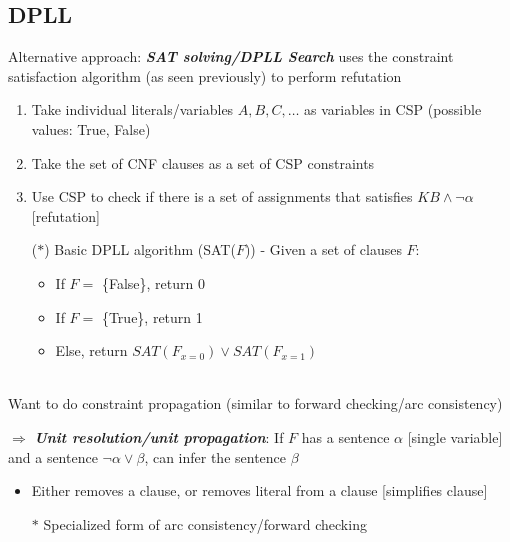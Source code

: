 \documentclass[12pt]{extarticle}
\theoremstyle{definition}
\theoremstyle{remark}
\newcommand{\pstart}[0]{\noindent}
\newcommand{\newp}[0]{~\\ \pstart}
\newcommand{\term}[1]{\noindent\textbf{\textit{#1}}}
\begin{document}
\subsection{DPLL}
Alternative approach: \term{SAT solving/DPLL Search} uses the constraint satisfaction algorithm (as seen previously) to perform refutation \begin{enumerate}
    \item Take individual literals/variables $A,B,C,\hdots$ as variables in CSP (possible values: True, False)
    \item Take the set of CNF clauses as a set of CSP constraints
    \item Use CSP to check if there is a set of assignments that satisfies $KB\land\neg\alpha$ [refutation] 

    \item[($\ast$)] Basic DPLL algorithm (SAT($F$)) - Given a set of clauses $F$: \begin{itemize}
            \item If $F=$ \{False\}, return 0
            \item If $F=$ \{True\}, return 1
            \item Else, return $SAT(F_{x=0})\lor SAT(F_{x=1})$
        \end{itemize}
\end{enumerate}

\newp
Want to do constraint propagation (similar to forward checking/arc consistency)

\vspace{4pt}\pstart
$\Rightarrow$ \term{Unit resolution/unit propagation}: If $F$ has a sentence $\alpha$ [single variable] and a sentence $\neg\alpha\lor\beta$, can infer the sentence $\beta$ \begin{itemize}
        \item Either removes a clause, or removes literal from a clause [simplifies clause]
        \item[$\ast$] Specialized form of arc consistency/forward checking
    \end{itemize}
\end{document}
